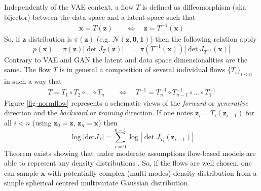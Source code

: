 \documentclass[11pt]{amsart}
\begin{document}
Independently of the VAE context, a flow $T$ is defined as diffeomorphism (aka bijector) between the data space and a latent space such that
\begin{align}
\bm{x} = T(\bm{z}) & \quad \Leftrightarrow \quad \bm{z} = T^{-1}(\bm{x})
\end{align}
So, if $\bm{z}$ distribution is $\pi(\bm{z})$ (e.g. $\mathcal{N}(\bm{z},\bm{0},\bm{1})$) then the following relation apply
\begin{equation}
p(\bm{x}) =  \pi(\bm{z})|\det J_T(\bm{z})|^{-1} = \pi(T^{-1}(\bm{x}))|\det J_{T^{-1}}(\bm{x})|
\end{equation}
Contrary to VAE and GAN the latent and data space dimensionalities are the same. The flow $T$ is in general a composition of several individual flows $\{T_i\}_{i<n}$ in such a way that
\begin{align}
T=T_1\circ T_2\circ \dots \circ T_n & \quad \Leftrightarrow \quad 
T^{-1}=T_n^{-1}\circ T_{n-1}^{-1}\circ \dots \circ T_1^{-1}
\end{align}
Figure \ref{fig-normflow} represents a schematic views of the \textit{forward} or \textit{generative} direction and the \textit{backward} or \textit{training} direction. 
If one notes $\bm{z}_i = T_i(\bm{z}_{i-1})$ for all $i<n$  (using $\bm{z}_0=\bm{z}$, $\bm{z}_n=\bm{x}$) then
\begin{equation}
\log |\mathrm{det} J_T| = \sum_{i=0}^{n-1} \log |\det J_{T_i}(\bm{z}_{i-1})|
\label{eq-flow-jacob}
\end{equation}
Theorem exists showing that under moderate assumptions flow-based models are able to represent any density distributions \citep{Bogachev2005,huang2019solving}. So, if the flows are well chosen, one can sample $\bm{x}$ with potentially complex (multi-modes) density distribution from a simple spherical centred multivariate Gaussian distribution.
\end{document}
